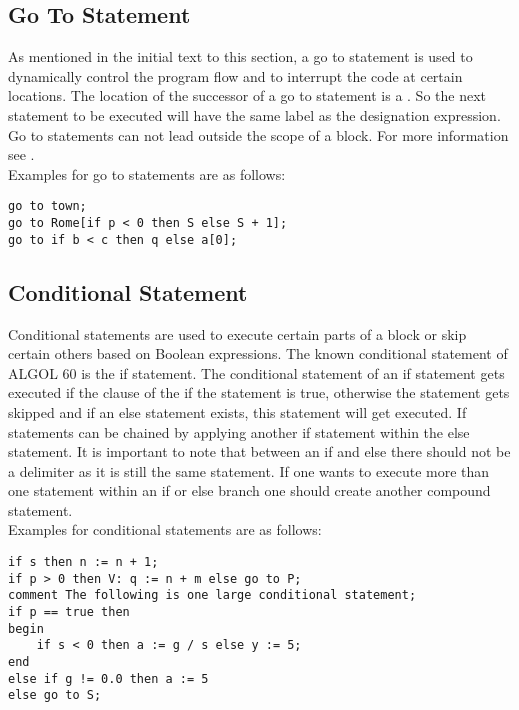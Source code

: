 \documentclass{article}
\begin{document}
\subsection{Go To Statement}
As mentioned in the initial text to this section, a go to statement is used to dynamically control the program flow and to interrupt the code at certain locations. The location of the successor of a go to statement is a . So the next statement to be executed will have the same label as the designation expression.\\
Go to statements can not lead outside the scope of a block. For more information see .\\

Examples for go to statements are as follows:\\ 
\begin{lstlisting}[language={[60]algol}]
go to town;
go to Rome[if p < 0 then S else S + 1];
go to if b < c then q else a[0];
\end{lstlisting}

\subsection{Conditional Statement}
Conditional statements are used to execute certain parts of a block or skip certain others based on Boolean expressions. The known conditional statement of ALGOL 60 is the if statement. The conditional statement of an if statement gets executed if the clause of the if the statement is true, otherwise the statement gets skipped and if an else statement exists, this statement will get executed. If statements can be chained by applying another if statement within the else statement. It is important to note that between an if and else there should not be a delimiter as it is still the same statement. If one wants to execute more than one statement within an if or else branch one should create another compound statement.\\

Examples for conditional statements are as follows:\\ 
\begin{lstlisting}[language={[60]algol}]
if s then n := n + 1;
if p > 0 then V: q := n + m else go to P;
comment The following is one large conditional statement;
if p == true then 
begin 
    if s < 0 then a := g / s else y := 5; 
end
else if g != 0.0 then a := 5
else go to S;
\end{lstlisting}
\end{document}

